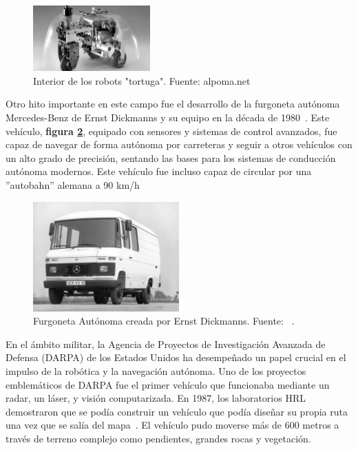 \begin{figure}[h]
    \centering
    \includegraphics[width=0.4\textwidth]{images/tortugas_william_grey.jpg}
    \caption{Interior de los robots "tortuga". Fuente: alpoma.net}
    \label{fig:tortugas_grey}
\end{figure}


Otro hito importante en este campo fue el desarrollo de la furgoneta autónoma Mercedes-Benz de Ernst Dickmanns y su equipo en la década de 
1980~\Cite{ernst80}. Este vehículo, \textbf{figura \ref{fig:furgoneta_ernst}}, equipado con sensores y sistemas de control avanzados, fue capaz de navegar de forma autónoma por 
carreteras y seguir a otros vehículos con un alto grado de precisión, sentando las bases para los sistemas de conducción autónoma modernos. 
Este vehículo fue   incluso capaz de circular por una ''autobahn'' alemana a 90 km/h

\begin{figure}[h]
    \centering
    \includegraphics[width=0.5\textwidth]{images/furgoneta_ernst_dickens.jpeg}
    \caption{Furgoneta Autónoma creada por Ernst Dickmanns. Fuente: ~\cite{ernst80}.}
    \label{fig:furgoneta_ernst}
\end{figure}

En el ámbito militar, la Agencia de Proyectos de Investigación Avanzada de Defensa (DARPA) de los Estados Unidos ha desempeñado un 
papel crucial en el impulso de la robótica y la navegación autónoma. Uno de los proyectos emblemáticos de DARPA fue el primer vehículo 
que funcionaba mediante un radar, un láser, y visión computarizada. En 1987, los laboratorios HRL demostraron que se podía construir un 
vehículo que podía diseñar su propia ruta una vez que se salía del mapa~\cite{DARPA20}. El vehículo pudo moverse más de 600 metros a través de terreno 
complejo como pendientes, grandes rocas y vegetación.


